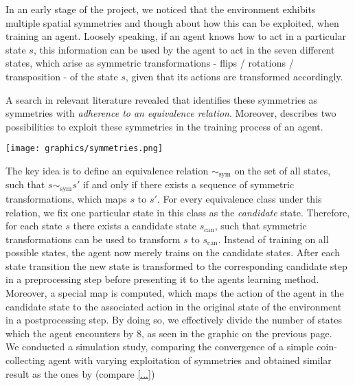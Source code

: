 

In an early stage of the project, we noticed that the environment exhibits multiple spatial symmetries and though about how this can be exploited, when training an agent. Loosely speaking, if an agent knows how to act in a particular state $s$, this information can be used by the agent to act in the seven different states, which arise as symmetric transformations - flips / rotations / transposition - of the state $s$, given that its actions are transformed accordingly.

A search in relevant literature revealed that \cite{zinkevich2001} identifies these symmetries as symmetries with \emph{adherence to an equivalence relation}. Moreover, \cite{agostini2009} describes two possibilities to exploit these symmetries in the training process of an agent.

\vspace{10pt}
\begin{center}
\begin{minipage}{\linewidth}
\texttt{[image: graphics/symmetries.png]}
\end{minipage}
\end{center}
\vspace{10pt}

The key idea is to define an equivalence relation $\sim_\text{sym}$ on the set of all states, such that $s \sim_\text{sym} s'$ if and only if there exists a sequence of symmetric transformations, which maps $s$ to $s'$. For every equivalence class under this relation, we fix one particular state in this class as the \emph{candidate} state. Therefore, for each state $s$ there exists a candidate state $s_\text{can}$, such that symmetric transformations can be used to transform $s$ to $s_\text{can}$. Instead of training on all possible states, the agent now merely trains on the candidate states. After each state transition the new state is transformed to the corresponding candidate step in a preprocessing step before presenting it to the agents learning method. Moreover, a special map is computed, which maps the action of the agent in the candidate state to the associated action in the original state of the environment in a postprocessing step. By doing so, we effectively divide the number of states which the agent encounters by 8, as seen in the graphic on the previous page. \\

We conducted a simulation study, comparing the convergence of a simple coin-collecting agent with varying exploitation of symmetries and obtained similar result as the ones by \cite{agostini2009} (compare \ref{...})